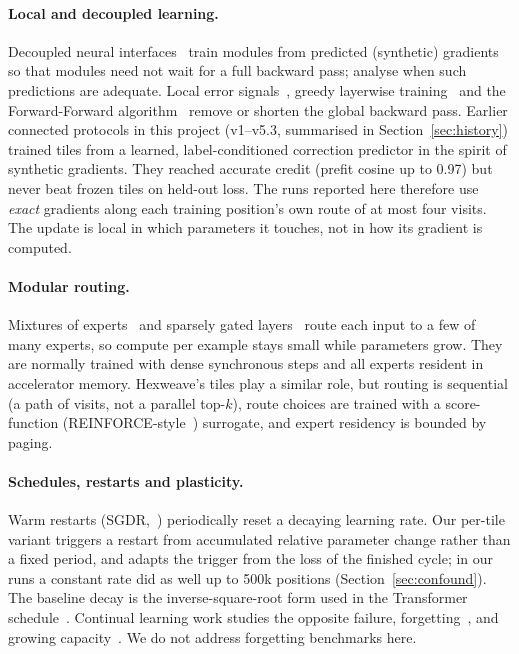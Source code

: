 \documentclass[10pt]{article}
\begin{document}
\paragraph{Local and decoupled learning.}
Decoupled neural interfaces~\citep{jaderberg2017dni} train modules from predicted (synthetic)
gradients so that modules need not wait for a full backward pass; \citet{czarnecki2017understanding}
analyse when such predictions are adequate. Local error signals~\citep{nokland2019local}, greedy
layerwise training~\citep{belilovsky2019greedy} and the Forward-Forward
algorithm~\citep{hinton2022forward} remove or shorten the global backward pass. Earlier connected
protocols in this project (v1--v5.3, summarised in Section~\ref{sec:history}) trained tiles from a
learned, label-conditioned correction predictor in the spirit of synthetic gradients. They reached
accurate credit (prefit cosine up to 0.97) but never beat frozen tiles on held-out loss. The runs
reported here therefore use \emph{exact} gradients along each training position's own route of at
most four visits. The update is local in which parameters it touches, not in how its gradient is
computed.

\paragraph{Modular routing.}
Mixtures of experts~\citep{jacobs1991adaptive} and sparsely gated
layers~\citep{shazeer2017outrageously,fedus2021switch} route each input to a few of many experts,
so compute per example stays small while parameters grow. They are normally trained with dense
synchronous steps and all experts resident in accelerator memory. Hexweave's tiles play a similar
role, but routing is sequential (a path of visits, not a parallel top-$k$), route choices are
trained with a score-function (REINFORCE-style~\citep{williams1992reinforce}) surrogate, and expert
residency is bounded by paging.

\paragraph{Schedules, restarts and plasticity.}
Warm restarts (SGDR,~\citep{loshchilov2017sgdr}) periodically reset a decaying learning rate. Our
per-tile variant triggers a restart from accumulated relative parameter change rather than a fixed
period, and adapts the trigger from the loss of the finished cycle; in our runs a constant rate did
as well up to 500k positions (Section~\ref{sec:confound}). The baseline decay is the
inverse-square-root form used in the Transformer schedule~\citep{vaswani2017attention}. Continual
learning work studies the opposite failure, forgetting~\citep{kirkpatrick2017ewc}, and growing
capacity~\citep{rusu2016progressive,yoon2017den}. We do not address forgetting benchmarks here.
\end{document}
